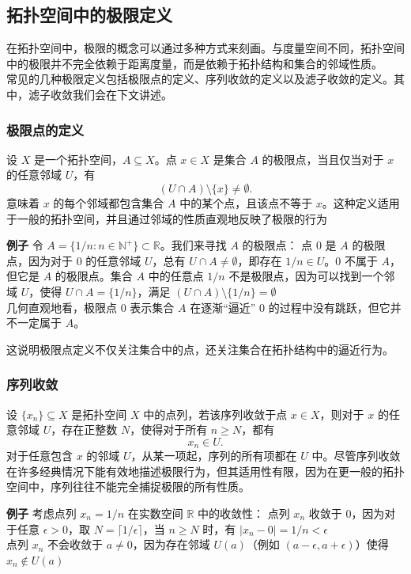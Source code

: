 \documentclass[a4paper, oneside]{article}
\begin{document}
\subsection{拓扑空间中的极限定义}

在拓扑空间中，极限的概念可以通过多种方式来刻画。与度量空间不同，拓扑空间中的极限并不完全依赖于距离度量，而是依赖于拓扑结构和集合的邻域性质。\\
\setlength{\parindent}{2em}常见的几种极限定义包括极限点的定义、序列收敛的定义以及滤子收敛的定义。其中，滤子收敛我们会在下文讲述。

\subsubsection{极限点的定义}

设 \( X \) 是一个拓扑空间，\( A \subseteq X \)。点 \( x \in X \) 是集合 \( A \) 的极限点，当且仅当对于 \( x \) 的任意邻域 \( U \)，有
\[
(U \cap A) \setminus \{x\} \neq \emptyset.
\]
意味着 \( x \) 的每个邻域都包含集合 \( A \) 中的某个点，且该点不等于 \( x \)。这种定义适用于一般的拓扑空间，并且通过邻域的性质直观地反映了极限的行为

\textbf{例子}
令 $A = \{1/n : n \in \mathbb{N}^+\} \subset \mathbb{R}$。我们来寻找 $A$ 的极限点：
    点 $0$ 是 $A$ 的极限点，因为对于 $0$ 的任意邻域 $U$，总有 $U \cap A \neq \emptyset$，即存在 $1/n \in U$。$0$ 不属于 $A$，但它是 $A$ 的极限点。集合 $A$ 中的任意点 $1/n$ 不是极限点，因为可以找到一个邻域 $U$，使得 $U \cap A = \{1/n\}$，满足 $(U \cap A) \setminus \{1/n\} = \emptyset$\\
几何直观地看，极限点 $0$ 表示集合 $A$ 在逐渐“逼近” $0$ 的过程中没有跳跃，但它并不一定属于 $A$。

这说明极限点定义不仅关注集合中的点，还关注集合在拓扑结构中的逼近行为。

\subsubsection{序列收敛}

设 \( \{x_n\} \subseteq X \) 是拓扑空间 \( X \) 中的点列，若该序列收敛于点 \( x \in X \)，则对于 \( x \) 的任意邻域 \( U \)，存在正整数 \( N \)，使得对于所有 \( n \geq N \)，都有
\[
x_n \in U.
\]
对于任意包含 \( x \) 的邻域 \( U \)，从某一项起，序列的所有项都在 \( U \) 中。尽管序列收敛在许多经典情况下能有效地描述极限行为，但其适用性有限，因为在更一般的拓扑空间中，序列往往不能完全捕捉极限的所有性质。

\textbf{例子}
考虑点列 $x_n = 1/n$ 在实数空间 $\mathbb{R}$ 中的收敛性：
    点列 $x_n$ 收敛于 $0$，因为对于任意 $\epsilon > 0$，取 $N = \lceil 1/\epsilon \rceil$，当 $n \geq N$ 时，有 $|x_n - 0| = 1/n < \epsilon$\\
    点列 $x_n$ 不会收敛于 $a \neq 0$，因为存在邻域 $U(a)$（例如 $(a - \epsilon, a + \epsilon)$）使得 $x_n \notin U(a)$
\end{document}
